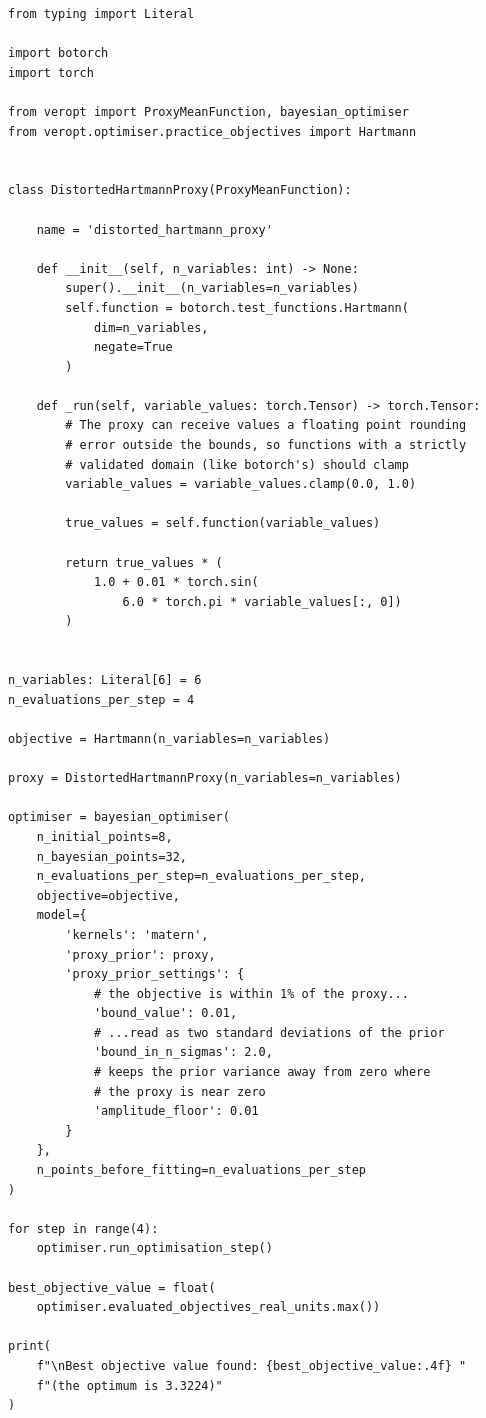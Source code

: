 \documentclass[11pt,a4paper]{article}
\begin{document}
\begin{lstlisting}
from typing import Literal

import botorch
import torch

from veropt import ProxyMeanFunction, bayesian_optimiser
from veropt.optimiser.practice_objectives import Hartmann


class DistortedHartmannProxy(ProxyMeanFunction):

    name = 'distorted_hartmann_proxy'

    def __init__(self, n_variables: int) -> None:
        super().__init__(n_variables=n_variables)
        self.function = botorch.test_functions.Hartmann(
            dim=n_variables,
            negate=True
        )

    def _run(self, variable_values: torch.Tensor) -> torch.Tensor:
        # The proxy can receive values a floating point rounding
        # error outside the bounds, so functions with a strictly
        # validated domain (like botorch's) should clamp
        variable_values = variable_values.clamp(0.0, 1.0)

        true_values = self.function(variable_values)

        return true_values * (
            1.0 + 0.01 * torch.sin(
                6.0 * torch.pi * variable_values[:, 0])
        )


n_variables: Literal[6] = 6
n_evaluations_per_step = 4

objective = Hartmann(n_variables=n_variables)

proxy = DistortedHartmannProxy(n_variables=n_variables)

optimiser = bayesian_optimiser(
    n_initial_points=8,
    n_bayesian_points=32,
    n_evaluations_per_step=n_evaluations_per_step,
    objective=objective,
    model={
        'kernels': 'matern',
        'proxy_prior': proxy,
        'proxy_prior_settings': {
            # the objective is within 1% of the proxy...
            'bound_value': 0.01,
            # ...read as two standard deviations of the prior
            'bound_in_n_sigmas': 2.0,
            # keeps the prior variance away from zero where
            # the proxy is near zero
            'amplitude_floor': 0.01
        }
    },
    n_points_before_fitting=n_evaluations_per_step
)

for step in range(4):
    optimiser.run_optimisation_step()

best_objective_value = float(
    optimiser.evaluated_objectives_real_units.max())

print(
    f"\nBest objective value found: {best_objective_value:.4f} "
    f"(the optimum is 3.3224)"
)
\end{lstlisting}
\end{document}
